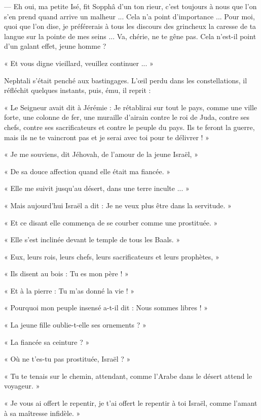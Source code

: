\documentclass[a4paper, 11pt, oneside, polutonikogreek, french]{article}
\begin{document}
--- Eh oui, ma petite Isé, fit Sopphâ d'un ton rieur, c'est toujours à nous que l'on s'en prend quand arrive un malheur ... Cela n'a point d'importance ... Pour moi, quoi que l'on dise, je préférerais à tous les discours des grincheux la caresse de ta langue sur la pointe de mes seins ... Va, chérie, ne te gêne pas. Cela n'est-il point d'un galant effet, jeune homme ?

« Et vous digne vieillard, veuillez continuer ... »

Nephtali s'était penché aux bastingages. L'œil perdu dans les constellations, il réfléchit quelques instants, puis, ému, il reprit :

\bigskip
\centerline{\EightStarTaper}
\centerline{\EightStarTaper\EightStarTaper}
\bigskip

« Le Seigneur avait dit à Jérémie : Je rétablirai sur tout le pays, comme une ville forte, une colonne de fer, une muraille d'airain contre le roi de Juda, contre ses chefs, contre ses sacrificateurs et contre le peuple du pays. Ils te feront la guerre, mais ils ne te vaincront pas et je serai avec toi pour te délivrer ! »

« Je me souviens, dit Jéhovah, de l'amour de la jeune Israël, »

« De sa douce affection quand elle était ma fiancée. »

« Elle me suivit jusqu'au désert, dans une terre inculte ... »

« Mais aujourd'hui Israël a dit : Je ne veux plus être dans la servitude. »

« Et ce disant elle commença de se courber comme une prostituée. »

« Elle s'est inclinée devant le temple de tous les Baals. »

« Eux, leurs rois, leurs chefs, leurs sacrificateurs et leurs prophètes, »

« Ils disent au bois : Tu es mon père ! »

« Et à la pierre : Tu m'as donné la vie ! »

« Pourquoi mon peuple insensé a-t-il dit : Nous sommes libres ! »

« La jeune fille oublie-t-elle ses ornements ? »

« La fiancée sa ceinture ? »

« Où ne t'es-tu pas prostituée, Israël ? »

« Tu te tenais sur le chemin, attendant, comme l'Arabe dans le désert attend le voyageur. »

« Je vous ai offert le repentir, je t'ai offert le repentir à toi Israël, comme l'amant à sa maîtresse infidèle. »
\end{document}
